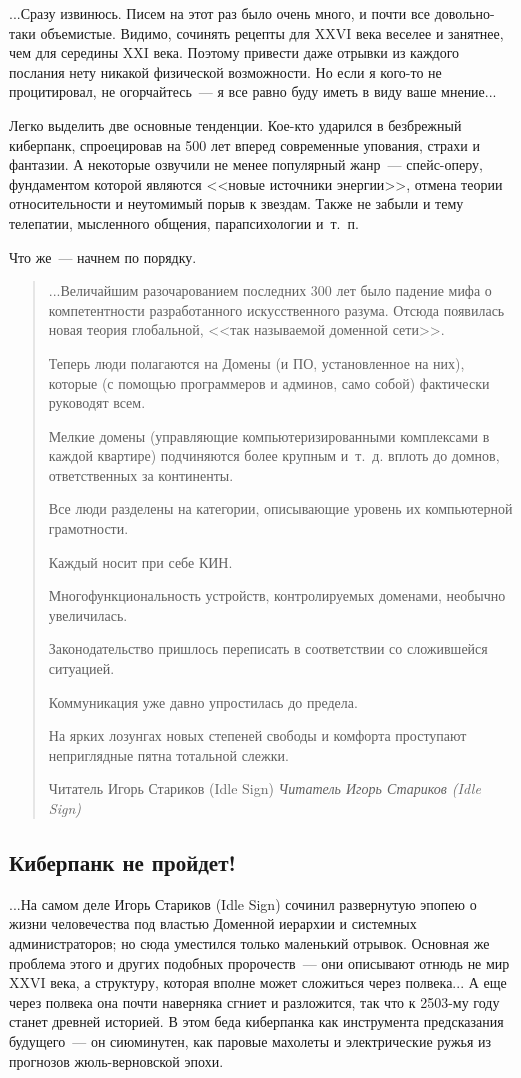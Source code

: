 \documentclass{scrbook}
\makeatletter
\newcommand{\flqq}{<<}
\newcommand{\frqq}{>>}
\newcommand{\mdash}{~--- }
\newcommand{\essaysection}[1]{\subsection*{#1}\nopagebreak}
\newcommand{\inlineauthor}[1]{\emph{#1}}
\newcommand{\myquotation}[2][\@empty]{
	\begin{quotation}
	#2

	\ifx\@empty#1
	\else
		\nopagebreak	
		\inlineauthor{#1}
	\fi
	\end{quotation}
}
\makeatother
\begin{document}
...Сразу извинюсь. Писем на этот раз было очень много, и почти все довольно-таки объемистые. Видимо, сочинять рецепты для XXVI века веселее и занятнее, чем для середины XXI века. Поэтому привести даже отрывки из каждого послания нету никакой физической возможности. Но если я кого-то не процитировал, не огорчайтесь{\mdash}я все равно буду иметь в виду ваше мнение...

Легко выделить две основные тенденции. Кое-кто ударился в безбрежный киберпанк, спроецировав на 500 лет вперед современные упования, страхи и фантазии. А некоторые озвучили не менее популярный жанр{\mdash}спейс-оперу, фундаментом которой являются {\flqq}новые источники энергии{\frqq}, отмена теории относительности и неутомимый порыв к звездам. Также не забыли и тему телепатии, мысленного общения, парапсихологии и~т.~п.

Что же{\mdash}начнем по порядку.

\myquotation[Читатель Игорь Стариков (Idle Sign)]{...Величайшим разочарованием последних 300 лет было падение мифа о компетентности разработанного искусственного разума. Отсюда появилась новая теория глобальной, {\flqq}так называемой доменной сети{\frqq}.

Теперь люди полагаются на Домены (и ПО, установленное на них), которые (с помощью программеров и админов, само собой) фактически руководят всем.

Мелкие домены (управляющие компьютеризированными комплексами в каждой квартире) подчиняются более крупным и~т.~д. вплоть до домнов, ответственных за континенты.

Все люди разделены на категории, описывающие уровень их компьютерной грамотности.

Каждый носит при себе КИН.

Многофункциональность устройств, контролируемых доменами, необычно увеличилась.

Законодательство пришлось переписать в соответствии со сложившейся ситуацией.

Коммуникация уже давно упростилась до предела.

На ярких лозунгах новых степеней свободы и комфорта проступают неприглядные пятна тотальной слежки.}

\essaysection{Киберпанк не пройдет!}

...На самом деле Игорь Стариков (Idle Sign) сочинил развернутую эпопею о жизни человечества под властью Доменной иерархии и системных администраторов; но сюда уместился только маленький отрывок. Основная же проблема этого и других подобных пророчеств{\mdash}они описывают отнюдь не мир XXVI века, а структуру, которая вполне может сложиться через полвека... А еще через полвека она почти наверняка сгниет и разложится, так что к 2503-му году станет древней историей. В этом беда киберпанка как инструмента предсказания будущего{\mdash}он сиюминутен, как паровые махолеты и электрические ружья из прогнозов жюль-верновской эпохи.
\end{document}
